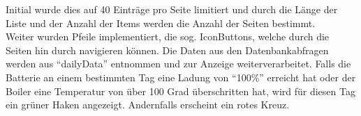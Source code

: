\documentclass{article}
\begin{document}
    Initial wurde dies auf 40 Einträge pro Seite limitiert und durch die Länge der Liste und der Anzahl der Items werden
    die Anzahl der Seiten bestimmt. \\
    Weiter wurden Pfeile implementiert, die sog. IconButtons, welche durch die Seiten hin durch navigieren können.
    Die Daten aus den Datenbankabfragen werden aus \enquote{dailyData} entnommen und zur Anzeige weiterverarbeitet.
    Falls die Batterie an einem bestimmten Tag eine Ladung von \enquote{100\%} erreicht hat oder der Boiler eine
    Temperatur von über 100 Grad überschritten hat, wird für diesen Tag ein grüner Haken angezeigt.
    Andernfalls erscheint ein rotes Kreuz.

    
    
\end{document}
